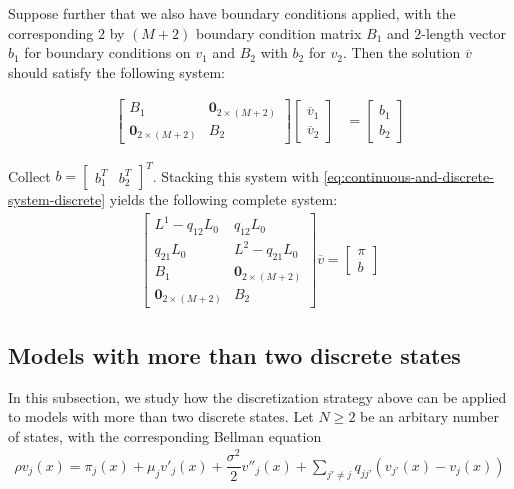 \documentclass[11pt]{article}
\theoremstyle{definition}
\begin{document}
Suppose further that we also have boundary conditions applied, with the corresponding $2$ by $(M+2)$ boundary condition matrix $B_1$ and $2$-length vector $b_1$ for boundary conditions on $v_1$ and $B_2$ with $b_2$ for $v_2$. Then the solution $\overline{v}$ should satisfy the following system:

\begin{align}
\begin{bmatrix}
B_1 & \mathbf{0}_{2 \times (M+2)} \\
\mathbf{0}_{2 \times (M+2)} & B_2 
\end{bmatrix}
\begin{bmatrix}
\overline{v}_1 \\
\overline{v}_2
\end{bmatrix} &= 
\begin{bmatrix}
b_1\\
b_2
\end{bmatrix} 
\end{align}

Collect $b = \begin{bmatrix}
b_1^T & b_2^T
\end{bmatrix}^T$. Stacking this system with \eqref{eq:continuous-and-discrete-system-discrete} yields the following complete system:
\begin{align}
\begin{bmatrix}
{L}^1 - q_{12} L_0 & q_{12} L_0 \\ 
q_{21} L_0 & {L}^2 - q_{21} L_0 \\
B_1 & \mathbf{0}_{2 \times (M+2)} \\
\mathbf{0}_{2 \times (M+2)} & B_2 
\end{bmatrix}
\overline{v}
=
\begin{bmatrix}
\pi \\
b
\end{bmatrix} \label{eq:continuous-and-discrete-system-complete}
\end{align}

\subsection{Models with more than two discrete states}
In this subsection, we study how the discretization strategy above can be applied to models with more than two discrete states. Let $N \geq 2$ be an arbitary number of states, with the corresponding Bellman equation
\begin{align}
	\rho v_{j}(x) = \pi_j(x)+\mu_j v'_j (x) + \dfrac{\sigma^2}{2} v''_j (x) + 
	\sum_{j' \neq j} q_{jj'}  \left(  v_{j'}(x) - v_j(x) \right) \label{eq:continuous-and-discrete-equation-larger-states}  
\end{align}
\end{document}
